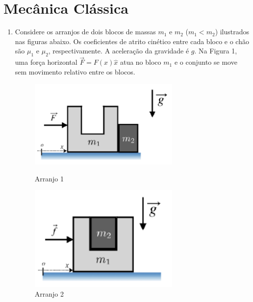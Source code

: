 %
%
\chapter{Mecânica Clássica}

\begin{enumerate}[start=1,label={\bfseries Q\arabic*.}]


\item Considere os arranjos de dois blocos de massas $m_{1}$ e $m_{2}$ ($m_{1} < m_{2}$) ilustrados nas figuras abaixo. Os coeficientes de atrito cinético entre cada bloco e o chão são $\mu_{1}$ e $\mu_{2}$, respectivamente. A aceleração da gravidade é $g$. Na Figura 1, uma força horizontal $\vec{F} = F(x)\hat{x}$ atua no bloco $m_{1}$ e o conjunto se move sem movimento relativo entre os blocos.


\begin{figure}[!ht]
	\centering
	\begin{minipage}{0.5\textwidth}
		\centering
		\includegraphics[width=0.7\textwidth]{classica-img/bloco1a.png} 
		\caption{Arranjo 1}
		\label{fig:bloco1apng}
	\end{minipage}\hfill
	\begin{minipage}{0.5\textwidth}
		\centering
		\includegraphics[width=0.7\textwidth]{classica-img/bloco2a.png}
		\caption{Arranjo 2}
		\label{fig:bloco2apng}
	\end{minipage}
\end{figure}




\end{enumerate}
